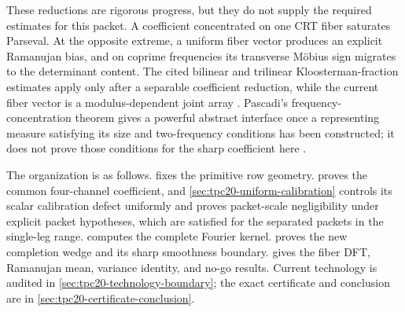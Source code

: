 These reductions are rigorous progress, but they do not supply the
required estimates for this packet.  A coefficient concentrated on one CRT fiber
saturates Parseval.  At the opposite extreme, a uniform fiber vector
produces an explicit Ramanujan bias, and on coprime frequencies its
transverse M\"obius sign migrates to the determinant content.  The cited
bilinear and trilinear Kloosterman-fraction estimates apply only after a
separable coefficient reduction, while the current fiber vector is a
modulus-dependent joint array
\citep{DukeFriedlanderIwaniec1997,BettinChandee2018,Wright2026}.
Pascadi's frequency-concentration theorem gives a powerful abstract
interface once a representing measure satisfying its size and
two-frequency conditions has been constructed; it does not prove those
conditions for the sharp coefficient here \citep{Pascadi2026LargeSieve}.

The organization is as follows.   fixes the
primitive row geometry.   proves the
common four-channel coefficient, and
\cref{sec:tpc20-uniform-calibration} controls its scalar calibration
defect uniformly and proves packet-scale negligibility under explicit
packet hypotheses, which are satisfied for the separated packets in the
single-leg range.   computes the complete
Fourier kernel.   proves the new completion
wedge and its sharp smoothness boundary.
 gives the fiber DFT, Ramanujan mean,
variance identity, and no-go results.  Current technology is audited in
\cref{sec:tpc20-technology-boundary}; the exact certificate and conclusion
are in \cref{sec:tpc20-certificate-conclusion}.
